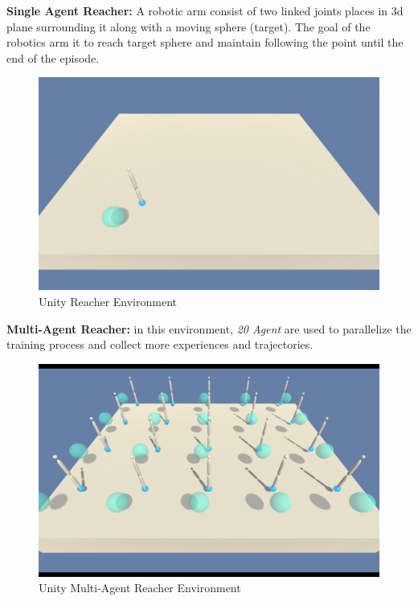 \textbf{Single Agent Reacher:} A robotic arm consist of two linked joints places in 3d plane surrounding it along with a moving sphere (target). The goal of the robotics arm it to reach target sphere and maintain following the point until the end of the episode. 

\begin{figure}[H]
    \begin{center}
            \includegraphics[width=0.7\linewidth]{figures/envs/unity_reacher_1.png}
            \caption{Unity Reacher Environment}
            \label{fig:unity_reacher_1}
    \end{center}
\end{figure}

\textbf{Multi-Agent Reacher:} in this environment, \textit{20 Agent} are used to parallelize the training process and collect more experiences and trajectories.

\begin{figure}[H]
    \begin{center}
            \includegraphics[width=0.7\linewidth]{figures/envs/unity_reacher_20.png}
            \caption{Unity Multi-Agent Reacher Environment}
            \label{fig:unity_reacher_20}
    \end{center}
\end{figure}

